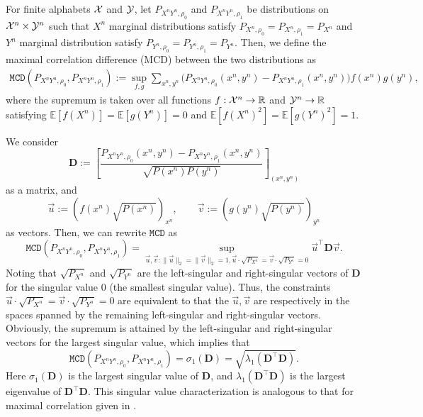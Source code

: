 \documentclass[journal,draftcls, onecolumn]{IEEEtran}
\begin{document}
For finite alphabets ${\cal X}$ and ${\cal Y}$, let $P_{X^nY^n,\rho_0}$ and $P_{X^nY^n,\rho_1}$ be
distributions on ${\cal X}^n\times {\cal Y}^n$ such that
$X^n$ marginal distributions satisfy $P_{X^n,\rho_0}=P_{X^n,\rho_1}=P_{X^n}$ and $Y^n$ marginal distribution
satisfy $P_{Y^n,\rho_0}=P_{Y^n,\rho_1}=P_{Y^n}$. Then, we define the maximal correlation difference (MCD) between the two
distributions as
\begin{align*}
\mathtt{MCD}(P_{X^nY^n,\rho_0},P_{X^nY^n,\rho_1}) := 
\sup_{f,g} \sum_{x^n,y^n}\big( P_{X^nY^n,\rho_0}(x^n,y^n) - P_{X^nY^n,\rho_1}(x^n,y^n) \big)f(x^n)g(y^n),
\end{align*}
where the supremum is taken over all functions $f:{\cal X}^n\to\mathbb{R}$ and ${\cal Y}^n\to\mathbb{R}$
satisfying $\mathbb{E}[f(X^n)]=\mathbb{E}[g(Y^n)]=0$ and $\mathbb{E}[f(X^n)^2]=\mathbb{E}[g(Y^n)^2]=1$.

We consider 
\[
\mathbf{D}:=\left[\frac{P_{X^{n}Y^{n},\rho_{0}}(x^{n},y^{n})-P_{X^{n}Y^{n},\rho_{1}}(x^{n},y^{n})}{\sqrt{P(x^{n})P(y^{n})}}\right]_{(x^{n},y^{n})}
\]
as a matrix, and 
\[
\vec{u}:=(f(x^{n})\sqrt{P(x^{n})})_{x^{n}},\qquad\vec{v}:=(g(y^{n})\sqrt{P(y^{n})})_{y^{n}}
\]
as vectors. Then, we can rewrite $\mathtt{MCD}$ as 
\[
\mathtt{MCD}(P_{X^nY^n,\rho_0},P_{X^nY^n,\rho_1})=\sup_{\vec{u},\vec{v}:\|\vec{u}\|_{2}=\|\vec{v}\|_{2}=1,\vec{u}\cdot\sqrt{P_{X^{n}}}=\vec{v}\cdot\sqrt{P_{Y^{n}}}=0}\vec{u}^{\top}\mathbf{D}\vec{v}.
\]
Noting that $\sqrt{P_{X^{n}}}$ and $\sqrt{P_{Y^{n}}}$ are the left-singular and right-singular vectors of $\mathbf{D}$ for the singular value $0$ (the smallest  singular value).
Thus, the constraints $\vec{u}\cdot\sqrt{P_{X^{n}}}=\vec{v}\cdot\sqrt{P_{Y^{n}}}=0$ are equivalent to that the $\vec{u},\vec{v}$ are respectively in the spaces  spanned by the remaining left-singular and right-singular vectors. Obviously, the supremum is attained by the left-singular and right-singular vectors for the largest singular value, which implies that 
\[
\mathtt{MCD}(P_{X^nY^n,\rho_0},P_{X^nY^n,\rho_1})=\sigma_{1}(\mathbf{D})=\sqrt{\lambda_{1}(\mathbf{D}^{\top}\mathbf{D})}.
\]
Here $\sigma_{1}(\mathbf{D})$ is the largest singular value of $\mathbf{D}$,
and $\lambda_{1}(\mathbf{D}^{\top}\mathbf{D})$ is the largest eigenvalue
of $\mathbf{D}^{\top}\mathbf{D}$. This singular value characterization is
analogous to that for maximal correlation given in  \cite{anantharam2013maximal}. 
\end{document}
